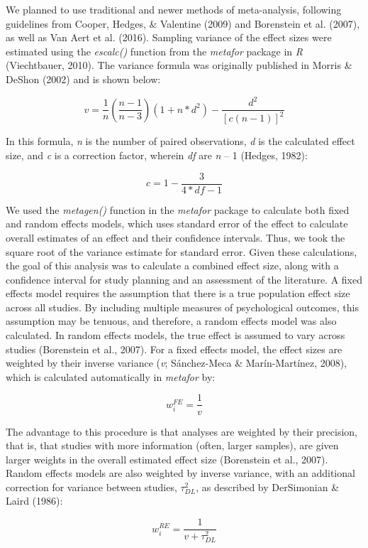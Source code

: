 \documentclass[man]{apa6}
\theoremstyle{definition}
\theoremstyle{definition}
\theoremstyle{definition}
\theoremstyle{remark}
\begin{document}
We planned to use traditional and newer methods of meta-analysis,
following guidelines from Cooper, Hedges, \& Valentine (2009) and
Borenstein et al. (2007), as well as Van Aert et al. (2016). Sampling
variance of the effect sizes were estimated using the \emph{escalc()}
function from the \emph{metafor} package in \emph{R} (Viechtbauer,
2010). The variance formula was originally published in Morris \& DeShon
(2002) and is shown below:

\[
v = \frac { 1 } { n } (\frac { n - 1 } { n - 3 } )(1 + n*d^2) - \frac { d^2 } { [c(n-1)]^2}
\]

In this formula, \emph{n} is the number of paired observations, \emph{d}
is the calculated effect size, and \emph{c} is a correction factor,
wherein \emph{df} are \emph{n} -- 1 (Hedges, 1982):

\[
c = 1 - \frac { 3 } { 4*df - 1 }
\]

We used the \emph{metagen()} function in the \emph{metafor} package to
calculate both fixed and random effects models, which uses standard
error of the effect to calculate overall estimates of an effect and
their confidence intervals. Thus, we took the square root of the
variance estimate for standard error. Given these calculations, the goal
of this analysis was to calculate a combined effect size, along with a
confidence interval for study planning and an assessment of the
literature. A fixed effects model requires the assumption that there is
a true population effect size across all studies. By including multiple
measures of psychological outcomes, this assumption may be tenuous, and
therefore, a random effects model was also calculated. In random effects
models, the true effect is assumed to vary across studies (Borenstein et
al., 2007). For a fixed effects model, the effect sizes are weighted by
their inverse variance (\emph{v}; Sánchez-Meca \& Marín-Martínez, 2008),
which is calculated automatically in \emph{metafor} by:

\[
w_{i}^{FE} = \frac {1} {v}
\]

The advantage to this procedure is that analyses are weighted by their
precision, that is, that studies with more information (often, larger
samples), are given larger weights in the overall estimated effect size
(Borenstein et al., 2007). Random effects models are also weighted by
inverse variance, with an additional correction for variance between
studies, \(\tau^2_{DL}\), as described by DerSimonian \& Laird (1986):

\[
w_{i}^{RE} = \frac {1} {v + \tau^2_{DL}}
\]
\end{document}
